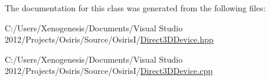 The documentation for this class was generated from the following files\-:\begin{DoxyCompactItemize}
\item 
C\-:/\-Users/\-Xenogenesis/\-Documents/\-Visual Studio 2012/\-Projects/\-Osiris/\-Source/\-Osiris\-I/\hyperlink{_direct3_d_device_8hpp}{Direct3\-D\-Device.\-hpp}\item 
C\-:/\-Users/\-Xenogenesis/\-Documents/\-Visual Studio 2012/\-Projects/\-Osiris/\-Source/\-Osiris\-I/\hyperlink{_direct3_d_device_8cpp}{Direct3\-D\-Device.\-cpp}\end{DoxyCompactItemize}
